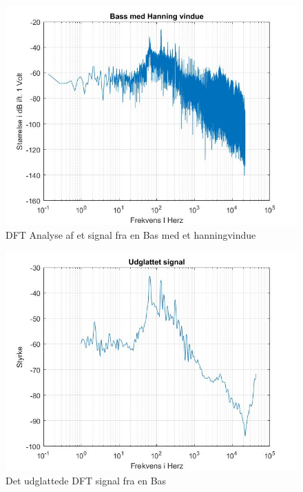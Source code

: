 \begin{figure}[H]
	\centering
	\includegraphics[width=180mm]{figures/Bass/hanning.jpg}
	\caption{DFT Analyse af et signal fra en Bas med et hanningvindue}
	\label{fig:Bas hanning}
\end{figure}

\begin{figure}[H]
	\centering
	\includegraphics[width=180mm]{figures/Bass/udglattet.jpg}
	\caption{Det udglattede DFT signal fra en Bas}
	\label{fig:Bas udglattet}
\end{figure}



